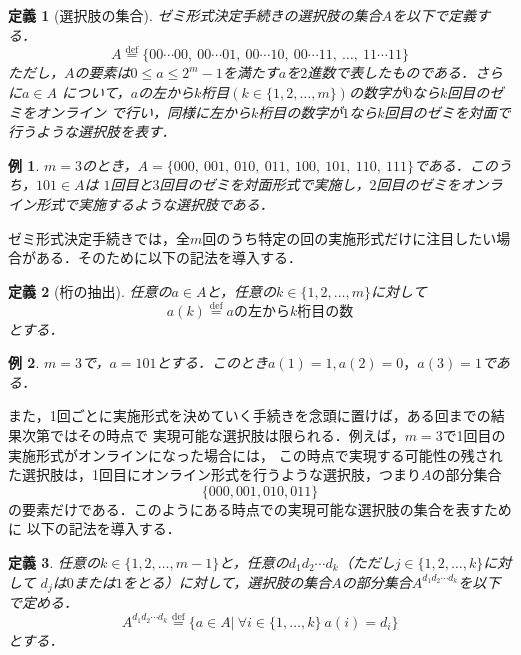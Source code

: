 \documentclass[dvipdfmx]{jsarticle}
\newtheorem{definition}{定義}
\newtheorem{example}{例}
\begin{document}
\begin{definition}[選択肢の集合]
  ゼミ形式決定手続きの選択肢の集合$A$を以下で定義する．
  \[
    A \stackrel{\mathrm{def}}{=} \{00\cdots 00,\ 00\cdots 01,\ 00\cdots 10,\ 00\cdots 11,\
    \ldots,\ 11\cdots 11\}
  \]
  ただし，$A$の要素は$0 \leq a \leq 2^m-1$を満たす$a$を$2$進数で表したものである．さらに$a \in A$
  について，$a$の左から$k$桁目$(k \in \{1,2,\ldots,m \})$の数字が$0$なら$k$回目のゼミをオンライン
  で行い，同様に左から$k$桁目の数字が$1$なら$k$回目のゼミを対面で行うような選択肢を表す．
\end{definition}

\begin{example}
  $m=3$のとき，$A = \{000,\ 001,\ 010,\ 011,\ 100,\ 101,\ 110,\ 111 \}$である．このうち，$101 \in A$は
  $1$回目と$3$回目のゼミを対面形式で実施し，$2$回目のゼミをオンライン形式で実施するような選択肢である．
\end{example}

ゼミ形式決定手続きでは，全$m$回のうち特定の回の実施形式だけに注目したい場合がある．そのために以下の記法を導入する．

\begin{definition}[桁の抽出]
  任意の$a \in A$と，任意の$k \in \{1,2,\ldots,m \}$に対して
  \[
    a(k) \stackrel{\mathrm{def}}{=} a\text{の左から}k\text{桁目の数}
  \]
  とする．
\end{definition}

\begin{example}
  $m = 3$で，$a = 101$とする．このとき$a(1) = 1,a(2)=0，a(3)=1$である．
\end{example}

また，1回ごとに実施形式を決めていく手続きを念頭に置けば，ある回までの結果次第ではその時点で
実現可能な選択肢は限られる．例えば，$m=3$で1回目の実施形式がオンラインになった場合には，
この時点で実現する可能性の残された選択肢は，1回目にオンライン形式を行うような選択肢，つまり$A$の部分集合
\[
  \{000, 001, 010, 011 \}
\]
の要素だけである．このようにある時点での実現可能な選択肢の集合を表すために
以下の記法を導入する．

\begin{definition}
  任意の$k \in \{1,2,\ldots,m-1\}$と，任意の$d_{1}d_{2}\cdots d_{k}$（ただし$j \in \{1,2,\ldots,k\}$に対して
  $d_j$は$0$または$1$をとる）に対して，選択肢の集合$A$の部分集合$A^{d_{1}d_{2}\cdots d_{k}}$を以下で定める．
  \[
    A^{d_{1}d_{2}\cdots d_{k}} \stackrel{\mathrm{def}}{=} \{a \in A |\ 
      \forall i \in \{1,\ldots,k\} \ a(i) = d_i \}
  \]
  とする．
\end{definition}
\end{document}
